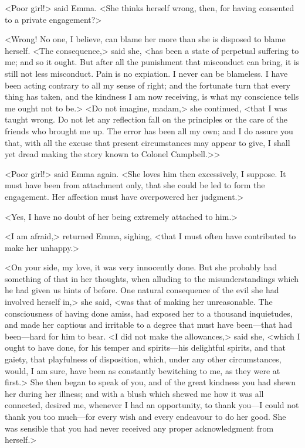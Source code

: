 <Poor girl!> said Emma. <She thinks herself wrong, then, for having consented to a private engagement?>

<Wrong! No one, I believe, can blame her more than she is disposed to blame herself. <The consequence,> said she, <has been a state of perpetual suffering to me; and so it ought. But after all the punishment that misconduct can bring, it is still not less misconduct. Pain is no expiation. I never can be blameless. I have been acting contrary to all my sense of right; and the fortunate turn that every thing has taken, and the kindness I am now receiving, is what my conscience tells me ought not to be.> <Do not imagine, madam,> she continued, <that I was taught wrong. Do not let any reflection fall on the principles or the care of the friends who brought me up. The error has been all my own; and I do assure you that, with all the excuse that present circumstances may appear to give, I shall yet dread making the story known to Colonel Campbell.>>

<Poor girl!> said Emma again. <She loves him then excessively, I suppose. It must have been from attachment only, that she could be led to form the engagement. Her affection must have overpowered her judgment.>

<Yes, I have no doubt of her being extremely attached to him.>

<I am afraid,> returned Emma, sighing, <that I must often have contributed to make her unhappy.>

<On your side, my love, it was very innocently done. But she probably had something of that in her thoughts, when alluding to the misunderstandings which he had given us hints of before. One natural consequence of the evil she had involved herself in,> she said, <was that of making her unreasonable. The consciousness of having done amiss, had exposed her to a thousand inquietudes, and made her captious and irritable to a degree that must have been—that had been—hard for him to bear. <I did not make the allowances,> said she, <which I ought to have done, for his temper and spirits—his delightful spirits, and that gaiety, that playfulness of disposition, which, under any other circumstances, would, I am sure, have been as constantly bewitching to me, as they were at first.> She then began to speak of you, and of the great kindness you had shewn her during her illness; and with a blush which shewed me how it was all connected, desired me, whenever I had an opportunity, to thank you—I could not thank you too much—for every wish and every endeavour to do her good. She was sensible that you had never received any proper acknowledgment from herself.>

